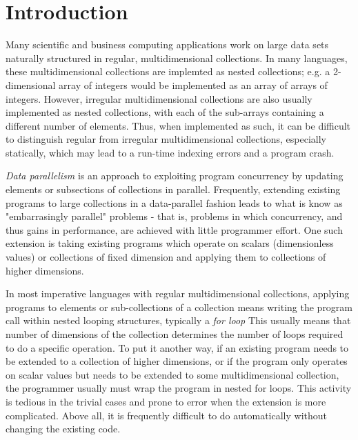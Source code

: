 \chapter{Introduction}
Many scientific and business computing applications work on large data sets naturally structured in regular, multidimensional collections.
In many languages, these multidimensional collections are implemted as nested collections; e.g. a 2-dimensional array of integers would be implemented as an array of arrays of integers.
However, irregular multidimensional collections are also usually implemented as nested collections, with each of the sub-arrays containing a different number of elements.
Thus, when implemented as such, it can be difficult to distinguish regular from irregular multidimensional collections, especially statically, which may lead to a run-time indexing errors and a program crash.

\textit{Data parallelism} is an approach to exploiting program concurrency by updating elements or subsections of collections in parallel.
Frequently, extending existing programs to large collections in a data-parallel fashion leads to what is know as "embarrasingly parallel" problems - that is, problems in which concurrency, and thus gains in performance, are achieved with little programmer effort.%
One such extension is taking existing programs which operate on scalars (dimensionless values) or collections of fixed dimension and applying them to collections of higher dimensions.

In most imperative languages with regular multidimensional collections, applying programs to elements or sub-collections of a collection means writing the program call within nested looping structures, typically a \textit{for loop}
This usually means that number of dimensions of the collection determines the number of loops required to do a specific operation.
To put it another way, if an existing program needs to be extended to a collection of higher dimensions, or if the program only operates on scalar values but needs to be extended to some multidimensional collection, the programmer usually must wrap the program in nested for loops.
This activity is tedious in the trivial cases and prone to error when the extension is more complicated.
Above all, it is frequently difficult to do automatically without changing the existing code.

